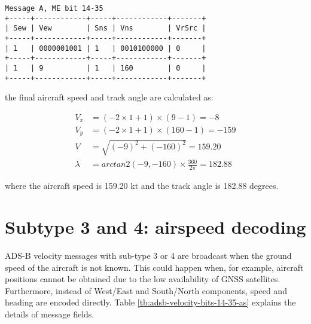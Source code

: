 \begin{verbatim}
Message A, ME bit 14-35
+-----+------------+-----+------------+-------+
| Sew | Vew        | Sns | Vns        | VrSrc |
+-----+------------+-----+------------+-------+
| 1   | 0000001001 | 1   | 0010100000 | 0     |
+-----+------------+-----+------------+-------+
| 1   | 9          | 1   | 160        | 0     |
+-----+------------+-----+------------+-------+
\end{verbatim}

the final aircraft speed and track angle are calculated as:

\begin{align}
  V_x &= (-2 \times 1 + 1) \times (9 - 1)  = -8 \\
  V_y &= (-2 \times 1 + 1) \times (160 - 1) = -159 \\
  V &= \sqrt{(-9)^2+ (-160)^2} = 159.20 \\
  \lambda &= arctan2(-9, -160) \times \frac{360}{2\pi} = 182.88
\end{align}

where the aircraft speed is 159.20 kt and the track angle is 182.88 degrees.


\section{Subtype 3 and 4: airspeed decoding}

ADS-B velocity messages with sub-type 3 or 4 are broadcast when the ground speed of the aircraft is not known. This could happen when, for example, aircraft positions cannot be obtained due to the low availability of GNSS satellites. Furthermore, instead of West/East and South/North components, speed and heading are encoded directly. Table \ref{tb:adsb-velocity-bits-14-35-as} explains the details of message fields.

